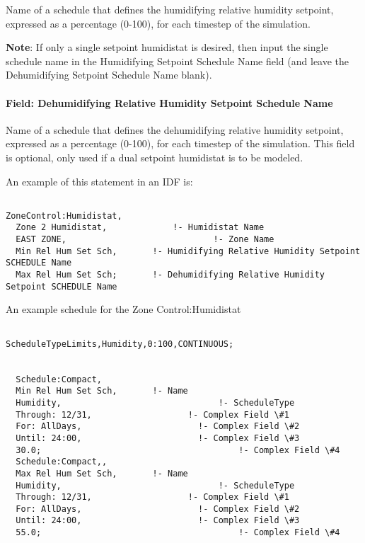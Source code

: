 Name of a schedule that defines the humidifying relative humidity setpoint, expressed as a percentage (0-100), for each timestep of the simulation.

\textbf{Note}: If only a single setpoint humidistat is desired, then input the single schedule name in the Humidifying Setpoint Schedule Name field (and leave the Dehumidifying Setpoint Schedule Name blank).

\paragraph{Field: Dehumidifying Relative Humidity Setpoint Schedule Name}\label{field-dehumidifying-relative-humidity-setpoint-schedule-name-1}

Name of a schedule that defines the dehumidifying relative humidity setpoint, expressed as a percentage (0-100), for each timestep of the simulation. This field is optional, only used if a dual setpoint humidistat is to be modeled.

An example of this statement in an IDF is:

\begin{lstlisting}

ZoneControl:Humidistat,
  Zone 2 Humidistat,             !- Humidistat Name
  EAST ZONE,                             !- Zone Name
  Min Rel Hum Set Sch,       !- Humidifying Relative Humidity Setpoint SCHEDULE Name
  Max Rel Hum Set Sch;       !- Dehumidifying Relative Humidity Setpoint SCHEDULE Name
\end{lstlisting}

An example schedule for the Zone Control:Humidistat

\begin{lstlisting}

ScheduleTypeLimits,Humidity,0:100,CONTINUOUS;


  Schedule:Compact,
  Min Rel Hum Set Sch,       !- Name
  Humidity,                               !- ScheduleType
  Through: 12/31,                   !- Complex Field \#1
  For: AllDays,                       !- Complex Field \#2
  Until: 24:00,                       !- Complex Field \#3
  30.0;                                       !- Complex Field \#4
  Schedule:Compact,,
  Max Rel Hum Set Sch,       !- Name
  Humidity,                               !- ScheduleType
  Through: 12/31,                   !- Complex Field \#1
  For: AllDays,                       !- Complex Field \#2
  Until: 24:00,                       !- Complex Field \#3
  55.0;                                       !- Complex Field \#4
\end{lstlisting}

